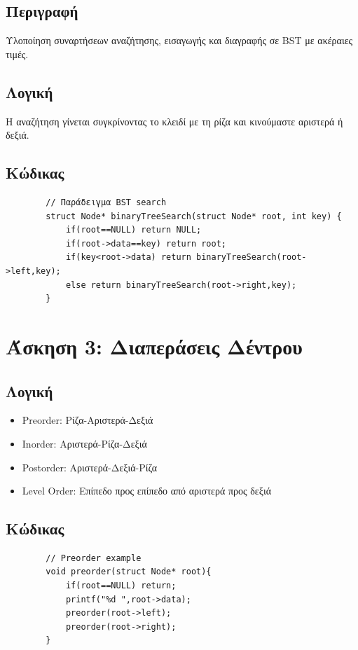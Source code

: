 \documentclass[a4paper,12pt]{article}
\begin{document}
	\subsection{Περιγραφή}
	Υλοποίηση συναρτήσεων αναζήτησης, εισαγωγής και διαγραφής σε BST με ακέραιες τιμές.
	
	\subsection{Λογική}
	Η αναζήτηση γίνεται συγκρίνοντας το κλειδί με τη ρίζα και κινούμαστε αριστερά ή δεξιά.
	
	\subsection{Κώδικας}
	\begin{lstlisting}
		// Παράδειγμα BST search
		struct Node* binaryTreeSearch(struct Node* root, int key) {
			if(root==NULL) return NULL;
			if(root->data==key) return root;
			if(key<root->data) return binaryTreeSearch(root->left,key);
			else return binaryTreeSearch(root->right,key);
		}
	\end{lstlisting}
	\newpage
	\section{Άσκηση 3: Διαπεράσεις Δέντρου}
	
	\subsection{Λογική}
	\begin{itemize}
		\item Preorder: Ρίζα-Αριστερά-Δεξιά
		\item Inorder: Αριστερά-Ρίζα-Δεξιά
		\item Postorder: Αριστερά-Δεξιά-Ρίζα
		\item Level Order: Επίπεδο προς επίπεδο από αριστερά προς δεξιά
	\end{itemize}
	
	\subsection{Κώδικας}
	\begin{lstlisting}
		// Preorder example
		void preorder(struct Node* root){
			if(root==NULL) return;
			printf("%d ",root->data);
			preorder(root->left);
			preorder(root->right);
		}
	\end{lstlisting}
	\newpage
\end{document}
